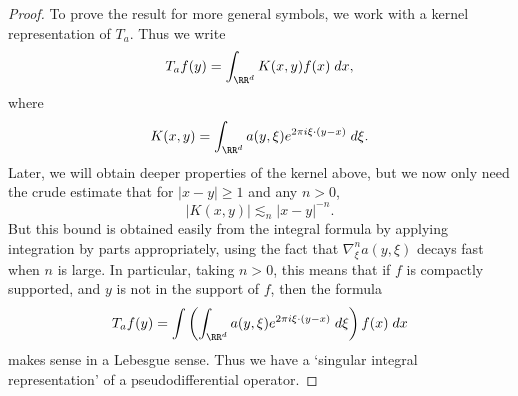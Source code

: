 \begin{proof}
    To prove the result for more general symbols, we work with a kernel representation of $T_a$. Thus we write
    \[ T_af(y) = \int_{\RR^d} K(x,y) f(x)\; dx, \]
    where
    \[ K(x,y) = \int_{\RR^d} a(y,\xi) e^{2 \pi i \xi \cdot (y - x)}\; d\xi. \]
    Later, we will obtain deeper properties of the kernel above, but we now only need the crude estimate that for $|x - y| \geq 1$ and any $n > 0$,
    \[ |K(x,y)| \lesssim_n |x - y|^{-n}. \]
    But this bound is obtained easily from the integral formula by applying integration by parts appropriately, using the fact that $\nabla_\xi^n a(y,\xi)$ decays fast when $n$ is large. In particular, taking $n > 0$, this means that if $f$ is compactly supported, and $y$ is not in the support of $f$, then the formula
    \[ T_af(y) = \int \left( \int_{\RR^d} a(y,\xi) e^{2 \pi i \xi \cdot (y - x)}\; d\xi \right) f(x)\; dx \]
    makes sense in a Lebesgue sense. Thus we have a `singular integral representation' of a pseudodifferential operator.


\end{proof}
